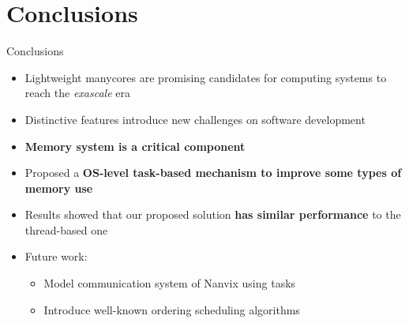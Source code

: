 \section{Conclusions}

	\begin{frame}{Conclusions}
		\begin{itemize}
			\item Lightweight manycores are promising candidates for
				computing systems to reach the \textit{exascale} era
			\item Distinctive features introduce new challenges on software
				development
			\item \textbf{Memory system is a critical component}
			\item Proposed a \textbf{OS-level task-based mechanism to improve some
				types of memory use}
			\item Results showed that our proposed solution \textbf{has similar
				performance} to the thread-based one
			\item Future work:
			\begin{itemize}
				\item Model communication system of Nanvix using tasks
				\item Introduce well-known ordering scheduling algorithms
			\end{itemize}
		\end{itemize}
	\end{frame}

